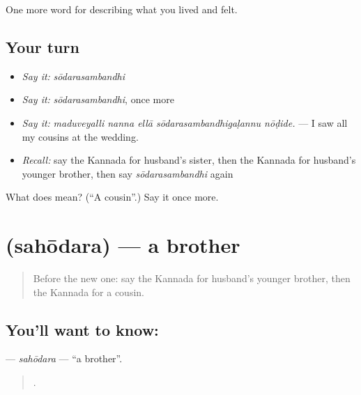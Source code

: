 \begin{grammarlens}[title={What you've built}]
One more word for describing what you lived and felt.
\end{grammarlens}

\subsection*{Your turn}
\begin{itemize}
\raggedright
  \item \emph{Say it:} \emph{sōdarasambandhi}
  \item \emph{Say it:} \emph{sōdarasambandhi}, once more
  \item \emph{Say it:} \emph{maduveyalli nanna ellā sōdarasambandhigaḷannu nōḍide.} — I saw all my cousins at the wedding.
  \item \emph{Recall:} say the Kannada for husband's sister, then the Kannada for husband's younger brother, then say \emph{sōdarasambandhi} again
\end{itemize}

\begin{tcolorbox}[breakable,colback=teal!4,colframe=teal!35!black,title={Before you move on}]
What does  mean? (\textquotedblleft{}A cousin\textquotedblright{}.) Say it once more.
\end{tcolorbox}
\section[\texorpdfstring{\kn{ಸಹೋದರ} (sahōdara)}{ಸಹೋದರ (sahōdara)}]{ (sahōdara) — a brother}

\label{lesson:KA-C525-sahodara}



\begin{quote}
Before the new one: say the Kannada for husband's younger brother, then the Kannada for a cousin.
\end{quote}

\subsection*{You'll want to know: }
\textbf{} — \emph{sahōdara} — \textquotedblleft{}a brother\textquotedblright{}.

\begin{quote}
   .
\end{quote}

